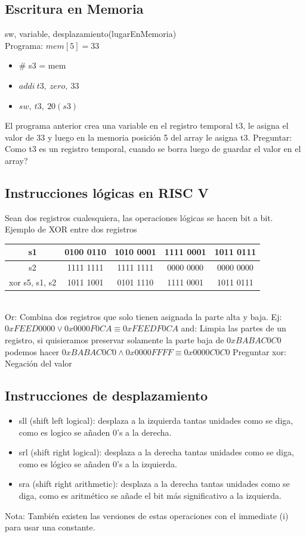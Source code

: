 \documentclass[10pt,a4paper]{article}
\begin{document}
\subsection*{Escritura en Memoria}
sw, variable, desplazamiento(lugarEnMemoria) \\
Programa: \(mem[5] = 33\) 
\begin{itemize}
    \item \# s3 = mem
    \item \(addi \ t3, \ zero,\ 33\)
    \item \(sw, \ t3, \ 20(s3)\)
\end{itemize}
El programa anterior crea una variable en el registro temporal t3, le asigna el valor de 33 y luego en la memoria posición 5 del array le asigna t3.
Preguntar: Como t3 es un registro temporal, cuando se borra luego de guardar el valor en el array? 
\subsection*{Instrucciones lógicas en RISC V}
Sean dos registros cualesquiera, las operaciones lógicas se hacen bit a bit. \\
Ejemplo de XOR entre dos registros
\begin{table}[h!]
    \centering
    \begin{tabular}{|c | c | c | c| c|}
    \hline
    s1 & 0100 0110 & 1010 0001 & 1111 0001 & 1011 0111 \\ \hline
    s2 & 1111 1111 & 1111 1111 & 0000 0000 & 0000 0000 \\ \hline
    xor s5, s1, s2 & 1011 1001 & 0101 1110 & 1111 0001 & 1011 0111 \\
    \hline
    \end{tabular}
    \label{tab:xor}
\end{table} 
\\
Or: Combina dos registros que solo tienen asignada la parte alta y baja. Ej: \(0xFEED0000 \lor 0x0000F0CA \equiv 0xFEEDF0CA \)  
and: Limpia las partes de un registro, si quisieramos preservar solamente la parte baja de \(0xBABAC0C0\) podemos hacer \(0xBABAC0C0 \land 0x0000FFFF \equiv 0x0000C0C0\) Preguntar 
xor: Negación del valor
\subsection*{Instrucciones de desplazamiento}
\begin{itemize}
    \item sll (shift left logical): desplaza a la izquierda tantas unidades como se diga, como es logico se añaden 0's a la derecha.
    \item srl (shift right logical): desplaza a la derecha tantas unidades como se diga, como es lógico se añaden 0's a la izquierda.
    \item sra (shift right arithmetic): desplaza a la derecha tantas unidades como se diga, como es aritmético se añade el bit más significativo a la izquierda.
\end{itemize}
Nota: También existen las versiones de estas operaciones con el immediate (i) para usar una constante.
\end{document}
